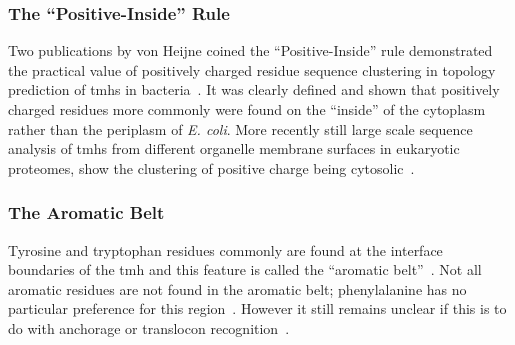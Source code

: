 \subsubsection{The ``Positive-Inside'' Rule}

Two publications by von Heijne coined the ``Positive-Inside'' rule demonstrated the practical value of positively charged residue sequence clustering in topology prediction of \gls{tmh}s in bacteria~\cite{VonHeijne1989,VonHeijne1992}. It was clearly defined and shown that positively charged residues more commonly were found on the ``inside'' of the cytoplasm rather than the periplasm of \textit{ E. coli}. More recently still large scale sequence analysis of \gls{tmh}s from different organelle membrane surfaces in eukaryotic proteomes, show the clustering of positive charge being cytosolic~\cite{Sharpe2010, Baeza-Delgado2013, Pogozheva2013}.

\subsubsection{The Aromatic Belt}

 Tyrosine and tryptophan residues commonly are found at the interface boundaries of the \gls{tmh} and this feature is called the ``aromatic belt''~\cite{Hessa2005, Granseth2005, Sharpe2010, Baeza-Delgado2013, Nilsson2005}. Not all aromatic residues are not found in the aromatic belt; phenylalanine has no particular preference for this region~\cite{Granseth2005, Braun1999}. However it still remains unclear if this is to do with anchorage or translocon recognition~\cite{Baeza-Delgado2013}.


